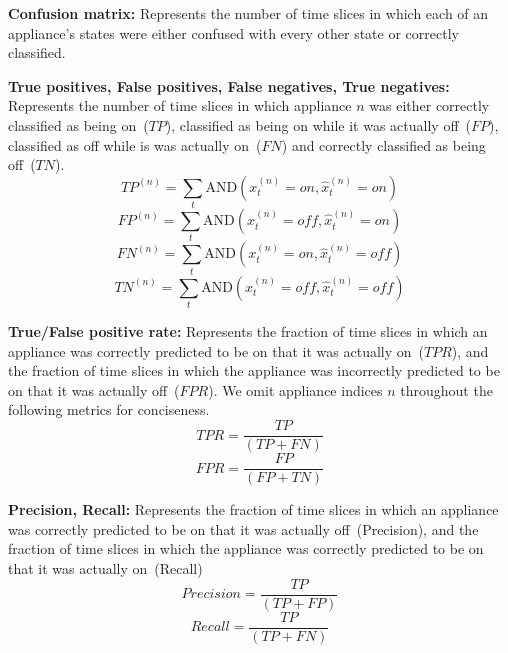 \documentclass{sig-alternate}
\begin{document}
\textbf{Confusion matrix:} Represents the number of time slices in which each of an appliance's states were either confused with every other state or correctly classified.

\textbf{True positives, False positives, False negatives, True negatives:} Represents the number of time slices in which appliance $n$ was either correctly classified as being on~($\mathit{TP}$), classified as being on while it was actually off~($\mathit{FP}$), classified as off while is was actually on~($\mathit{FN}$) and correctly classified as being off~($\mathit{TN}$).
\begin{equation}
\mathit{TP}^{(n)} = 
\sum_{t}
\mathrm{AND} \left ( x^{(n)}_t = \mathit{on}, \hat{x}^{(n)}_t = \mathit{on} \right )
\end{equation}
\begin{equation}
\mathit{FP}^{(n)} = 
\sum_{t}
\mathrm{AND} \left ( x^{(n)}_t = \mathit{off}, \hat{x}^{(n)}_t = \mathit{on} \right )
\end{equation}
\begin{equation}
\mathit{FN}^{(n)} = 
\sum_{t}
\mathrm{AND} \left ( x^{(n)}_t = \mathit{on}, \hat{x}^{(n)}_t = \mathit{off} \right )
\end{equation}
\begin{equation}
\mathit{TN}^{(n)} = 
\sum_{t}
\mathrm{AND} \left ( x^{(n)}_t = \mathit{off}, \hat{x}^{(n)}_t = \mathit{off} \right )
\end{equation}

\textbf{True/False positive rate:} Represents the fraction of time slices in which an appliance was correctly predicted to be on that it was actually on~($\mathit{TPR}$), and the fraction of time slices in which the appliance was incorrectly predicted to be on that it was actually off~($\mathit{FPR}$). We omit appliance indices $n$ throughout the following metrics for conciseness.
\begin{equation}
\mathit{TPR} = \frac{\mathit{TP}}{\left ( \mathit{TP} + \mathit{FN} \right )}
\end{equation}
\begin{equation}
\mathit{FPR} = \frac{\mathit{FP}}{\left ( \mathit{FP} + \mathit{TN} \right )}
\end{equation}

\textbf{Precision, Recall:} Represents the fraction of time slices in which an appliance was correctly predicted to be on that it was actually off~(Precision), and the fraction of time slices in which the appliance was correctly predicted to be on that it was actually on~(Recall)
\begin{equation}
\mathit{Precision} = \frac{\mathit{TP}}{\left ( \mathit{TP} + \mathit{FP} \right )}
\end{equation}
\begin{equation}
\mathit{Recall} = \frac{\mathit{TP}}{\left ( \mathit{TP} + \mathit{FN} \right )}
\end{equation}
\end{document}
